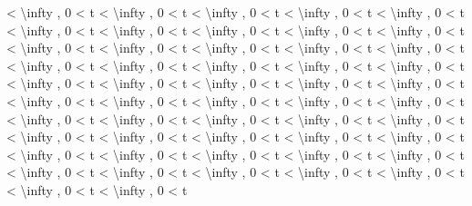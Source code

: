\documentclass[
]{article}
\begin{document}
\textless{} \textbackslash infty , 0 \textless{} t \textless{}
\textbackslash infty , 0 \textless{} t \textless{} \textbackslash infty
, 0 \textless{} t \textless{} \textbackslash infty , 0 \textless{} t
\textless{} \textbackslash infty , 0 \textless{} t \textless{}
\textbackslash infty , 0 \textless{} t \textless{} \textbackslash infty
, 0 \textless{} t \textless{} \textbackslash infty , 0 \textless{} t
\textless{} \textbackslash infty , 0 \textless{} t \textless{}
\textbackslash infty , 0 \textless{} t \textless{} \textbackslash infty
, 0 \textless{} t \textless{} \textbackslash infty , 0 \textless{} t
\textless{} \textbackslash infty , 0 \textless{} t \textless{}
\textbackslash infty , 0 \textless{} t \textless{} \textbackslash infty
, 0 \textless{} t \textless{} \textbackslash infty , 0 \textless{} t
\textless{} \textbackslash infty , 0 \textless{} t \textless{}
\textbackslash infty , 0 \textless{} t \textless{} \textbackslash infty
, 0 \textless{} t \textless{} \textbackslash infty , 0 \textless{} t
\textless{} \textbackslash infty , 0 \textless{} t \textless{}
\textbackslash infty , 0 \textless{} t \textless{} \textbackslash infty
, 0 \textless{} t \textless{} \textbackslash infty , 0 \textless{} t
\textless{} \textbackslash infty , 0 \textless{} t \textless{}
\textbackslash infty , 0 \textless{} t \textless{} \textbackslash infty
, 0 \textless{} t \textless{} \textbackslash infty , 0 \textless{} t
\textless{} \textbackslash infty , 0 \textless{} t \textless{}
\textbackslash infty , 0 \textless{} t \textless{} \textbackslash infty
, 0 \textless{} t \textless{} \textbackslash infty , 0 \textless{} t
\textless{} \textbackslash infty , 0 \textless{} t \textless{}
\textbackslash infty , 0 \textless{} t \textless{} \textbackslash infty
, 0 \textless{} t \textless{} \textbackslash infty , 0 \textless{} t
\textless{} \textbackslash infty , 0 \textless{} t \textless{}
\textbackslash infty , 0 \textless{} t \textless{} \textbackslash infty
, 0 \textless{} t \textless{} \textbackslash infty , 0 \textless{} t
\textless{} \textbackslash infty , 0 \textless{} t \textless{}
\textbackslash infty , 0 \textless{} t \textless{} \textbackslash infty
, 0 \textless{} t \textless{} \textbackslash infty , 0 \textless{} t
\textless{} \textbackslash infty , 0 \textless{} t \textless{}
\textbackslash infty , 0 \textless{} t \textless{} \textbackslash infty
, 0 \textless{} t \textless{} \textbackslash infty , 0 \textless{} t
\textless{} \textbackslash infty , 0 \textless{} t \textless{}
\textbackslash infty , 0 \textless{} t \textless{} \textbackslash infty
, 0 \textless{} t \textless{} \textbackslash infty , 0 \textless{} t
\end{document}
